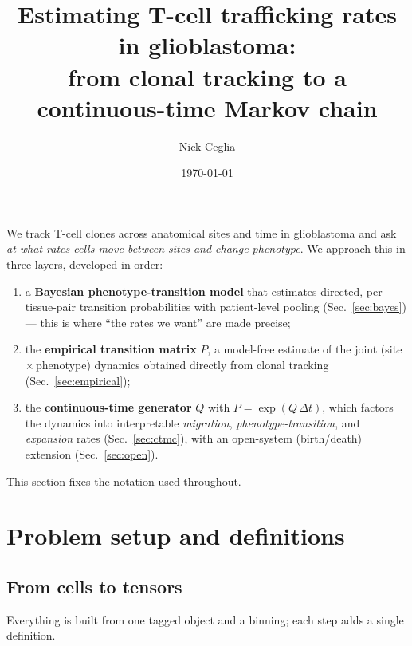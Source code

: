 \documentclass[11pt]{article}
\title{Estimating T-cell trafficking rates in glioblastoma:\\[2pt]
       \large from clonal tracking to a continuous-time Markov chain}
\author{Nick Ceglia}
\date{\today}
\begin{document}
\maketitle

\noindent
We track T-cell clones across anatomical sites and time in glioblastoma and ask
\emph{at what rates cells move between sites and change phenotype}. We approach
this in three layers, developed in order:
\begin{enumerate}\itemsep2pt
  \item a \textbf{Bayesian phenotype-transition model} that estimates directed,
        per-tissue-pair transition probabilities with patient-level pooling
        (Sec.~\ref{sec:bayes}) --- this is where ``the rates we want'' are made
        precise;
  \item the \textbf{empirical transition matrix} $P$, a model-free estimate of
        the joint (site\,$\times$\,phenotype) dynamics obtained directly from
        clonal tracking (Sec.~\ref{sec:empirical});
  \item the \textbf{continuous-time generator} $Q$ with $P=\exp(Q\,\Delta t)$,
        which factors the dynamics into interpretable \emph{migration},
        \emph{phenotype-transition}, and \emph{expansion} rates
        (Sec.~\ref{sec:ctmc}), with an open-system (birth/death) extension
        (Sec.~\ref{sec:open}).
\end{enumerate}
This section fixes the notation used throughout.

\section{Problem setup and definitions}
\label{sec:setup}

\subsection{From cells to tensors}

Everything is built from one tagged object and a binning; each step adds a
single definition.
\end{document}
